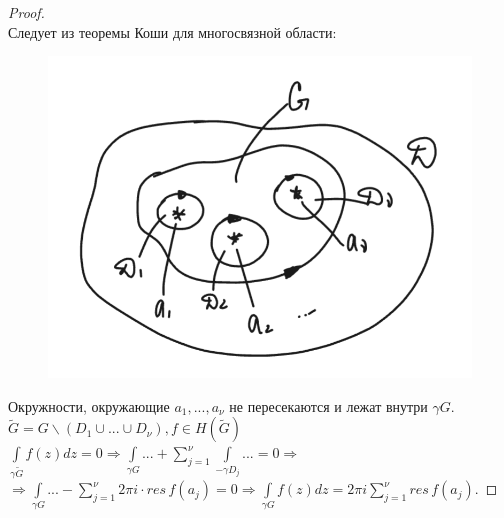 \begin{proof}
    \ \\
    Следует из теоремы Коши для многосвязной области:\\
    \begin{figure}[h]
        \centering
        \includegraphics[width=1\linewidth]{answers/img/ans15.png}
    \end{figure}
    Окружности, окружающие $a_1, ..., a_\nu$ не пересекаются и лежат внутри $\gamma G$.\\
    $\tilde{G}=G\backslash (D_1 \cup ...\cup D_\nu), f\in H(\tilde{G})$\\
    $\int\limits_{\gamma \tilde{G}} f(z)dz = 0 \Rightarrow \int\limits_{\gamma G}...+\sum_{j=1}^\nu \int\limits_{-\gamma D_j}...=0 \Rightarrow$\\
    $\Rightarrow \int\limits_{\gamma G}...-\sum_{j=1}^\nu 2\pi i \cdot res\, f(a_j)=0 \Rightarrow \int\limits_{\gamma G}f(z)dz=2\pi i \sum_{j=1}^\nu res\,f(a_j)$.
\end{proof}